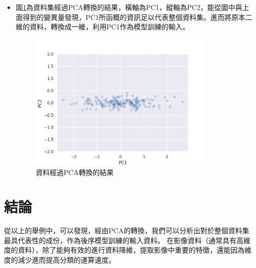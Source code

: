 \begin{itemize}
	\item
	      圖\ref{fig:PcaTransform}為資料集經過PCA轉換的結果，橫軸為PC1，縱軸為PC2，能從圖中與上面得到的變異量發現，PC1所函概的資訊足以代表整個資料集。進而將原本二維的資料，轉換成一維，利用PC1作為模型訓練的輸入。


	      \begin{figure}[H]
		      \centering
		      \includegraphics[width=9cm]{pic/pca_transform.png}
		      \caption{資料經過PCA轉換的結果}
		      \label{fig:PcaTransform}
	      \end{figure}

\end{itemize}


\section {結論}
從以上的舉例中，可以發現，經由PCA的轉換，我們可以分析出對於整個資料集最具代表性的成份，作為後序模型訓練的輸入資料。
在影像資料（通常具有高維度的資料），除了能夠有效的進行資料降維，提取影像中重要的特徵，還能因為維度的減少進而提高分類的運算速度。

